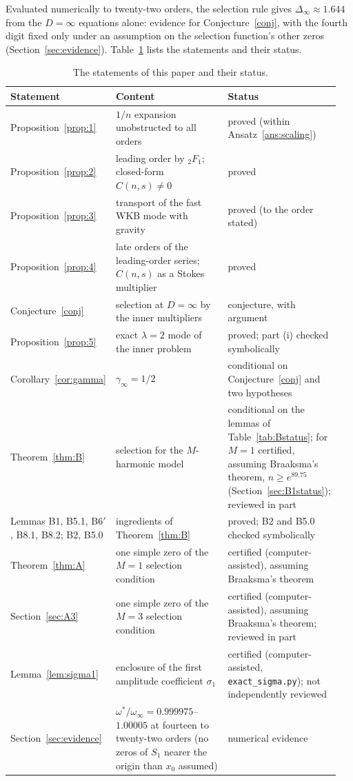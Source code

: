 \documentclass{amsart}
\numberwithin{equation}{section}
\theoremstyle{plain}
\theoremstyle{definition}
\theoremstyle{remark}
\newcommand{\Dinf}{\Delta_\infty}
\newcommand{\winf}{\omega_\infty}
\newcommand{\repo}[1]{\texttt{#1}}
\begin{document}
Evaluated numerically to twenty-two orders, the selection rule gives $\Dinf \approx 1.644$ from the $D = \infty$ equations
alone: evidence for Conjecture~\ref{conj}, with the fourth digit fixed only under an assumption on the selection function's
other zeros (Section~\ref{sec:evidence}).
Table~\ref{tab:status} lists the statements and their status.

\begin{table}[t]
\caption{The statements of this paper and their status.}
\label{tab:status}
\footnotesize
\begin{tabular}{@{}p{0.24\linewidth}p{0.4\linewidth}p{0.31\linewidth}@{}}
\toprule
Statement & Content & Status \\
\midrule
Proposition~\ref{prop:1} & $1/n$ expansion unobstructed to all orders & proved (within Ansatz~\ref{ans:scaling}) \\
Proposition~\ref{prop:2} & leading order by ${}_2F_1$; closed-form $C(n,s) \neq 0$ & proved \\
Proposition~\ref{prop:3} & transport of the fast WKB mode with gravity & proved (to the order stated) \\
Proposition~\ref{prop:4} & late orders of the leading-order series; $C(n,s)$ as a Stokes multiplier & proved \\
Conjecture~\ref{conj} & selection at $D = \infty$ by the inner multipliers & conjecture, with argument \\
Proposition~\ref{prop:5} & exact $\lambda = 2$ mode of the inner problem & proved; part (i) checked symbolically \\
Corollary~\ref{cor:gamma} & $\gamma_\infty = 1/2$ & conditional on Conjecture~\ref{conj} and two hypotheses \\
Theorem~\ref{thm:B} & selection for the $M$-harmonic model & conditional on the lemmas of Table~\ref{tab:Bstatus}; for $M = 1$ certified, assuming Braaksma's theorem, $n \ge e^{89.75}$ (Section~\ref{sec:B1status}); reviewed in part \\
Lemmas B1, B5.1, B6$'$, B8.1, B8.2; B2, B5.0 & ingredients of Theorem~\ref{thm:B} & proved; B2 and B5.0 checked symbolically \\
Theorem~\ref{thm:A} & one simple zero of the $M = 1$ selection condition & certified (computer-assisted), assuming Braaksma's theorem \\
Section~\ref{sec:A3} & one simple zero of the $M = 3$ selection condition & certified (computer-assisted), assuming Braaksma's theorem; reviewed in part \\
Lemma~\ref{lem:sigma1} & enclosure of the first amplitude coefficient $\sigma_1$ & certified (computer-assisted,\newline
\repo{exact\_sigma.py}); not independently reviewed \\
Section~\ref{sec:evidence} & $\omega^*/\winf = 0.999975$--$1.00005$ at fourteen to twenty-two orders (no zeros of $S_1$ nearer the origin than $x_0$ assumed) & numerical evidence \\
\bottomrule
\end{tabular}
\end{table}
\end{document}
